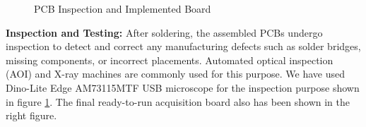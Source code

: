 \begin{figure}[htbp]
\caption{PCB Inspection and Implemented Board}
\label{fig:x Implemented Board}
\end{figure}
\textbf{Inspection and Testing:}  
 After soldering, the assembled PCBs undergo inspection to detect and correct any manufacturing defects such as solder bridges, missing components, or incorrect placements. Automated optical inspection (AOI) and X-ray machines are commonly used for this purpose. We have used Dino-Lite Edge AM73115MTF USB microscope for the inspection purpose shown in figure \ref{fig:x Implemented Board}. The final ready-to-run acquisition board also has been shown in the right figure.
\par

